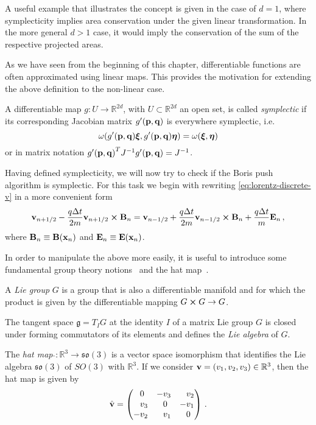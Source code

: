 \documentclass[12pt, class=report, crop=false]{standalone}
\begin{document}
A useful example that illustrates the concept is given in the case of \(d=1\),
where symplecticity implies area conservation under the given
linear transformation. In the more general \(d>1\) case, it would imply the conservation of the sum
of the respective projected areas.

As we have seen from the beginning of this chapter, differentiable
functions are often approximated using linear maps. This provides
the motivation for extending the above definition to the non-linear case.

\begin{definition}%
  \label{def:symplecticity-nonlinear}
  A differentiable map \(g:U \to \mathbb{R}^{2d}\), with \(U \subset \mathbb{R}^{2d}\) an open set, is called
  \emph{symplectic} if its corresponding Jacobian matrix \(g'(\vb{p},\vb{q})\) is everywhere symplectic, i.e.
  \[
  \omega(g'(\vb{p},\vb{q})\vb*{\xi}, g'(\vb{p},\vb{q})\vb*{\eta}) =
  \omega(\vb*{\xi},\vb*{\eta})
  \]
  or in matrix notation \({g'(\vb{p},\vb{q})}^T J^{-1} g'(\vb{p},\vb{q}) = J^{-1}\).
\end{definition}

Having defined symplecticity, we will now try to check if the Boris
push algorithm is symplectic. For this task we begin with rewriting
\cref{eq:lorentz-discrete-v} in a more convenient form
\[
\vb{v}_{n+1/2} - \frac{q \Delta t}{2m} \vb{v}_{n+1/2} \cp \vb{B}_n =
\vb{v}_{n-1/2} + \frac{q \Delta t}{2m} \vb{v}_{n-1/2} \cp \vb{B}_n
+ \frac{q \Delta t}{m} \vb{E}_n\,,
\]
where \(\vb{B}_n \equiv \vb{B}(\vb{x}_n)\) and
\(\vb{E}_n \equiv \vb{E}(\vb{x}_n)\).

In order to manipulate the above more easily, it is useful to introduce some
fundamental group theory notions~\autocite[118]{hairer_geometricnumerical_2006}
and the hat map~\autocite[289]{marsden_introductionmechanics_1999}.

\begin{definition}
  A \emph{Lie group} \(G\) is a group that is also a differentiable
  manifold and for which the product is given by the differentiable
  mapping \(G \cp G \to G\).
\end{definition}

The tangent space \(\mathfrak{g} = T_I G\) at the identity \(I\)
of a matrix Lie group \(G\) is closed under forming commutators
of its elements and defines the \emph{Lie algebra} of \(G\).

\begin{definition}
  The \emph{hat map} \(\hat{}: \mathbb{R}^3 \to \mathfrak{so}(3)\) is a
  vector space isomorphism that identifies the Lie algebra \(\mathfrak{so}(3)\)
  of \(SO(3)\) with \(\mathbb{R}^3\). If we consider
  \(\vb{v} = (v_1,v_2,v_3) \in \mathbb{R}^3\), then the hat map
  is given by
  \[
    \hat{\vb{v}} =
    \begin{pmatrix}
      \phantom{-}0\phantom{_1} & -v_3           & \phantom{-}v_2 \\
      \phantom{-}v_3 & \phantom{-}0\phantom{_1} &           -v_1 \\
            -v_2     & \phantom{-}v_1 &\phantom{-}0\phantom{_1}
    \end{pmatrix}\,.
  \]
\end{definition}
\end{document}
